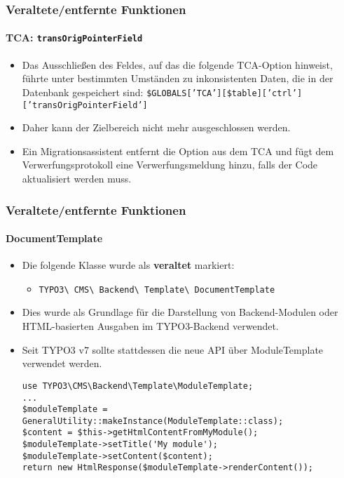 \begin{frame}[fragile]
	\frametitle{Veraltete/entfernte Funktionen}
	\framesubtitle{TCA: \texttt{transOrigPointerField}}

	\begin{itemize}
		\item Das Ausschließen des Feldes, auf das die folgende TCA-Option hinweist, führte unter bestimmten Umständen zu inkonsistenten Daten, die in der Datenbank gespeichert sind:
			\small
				\texttt{\$GLOBALS['TCA'][\$table]['ctrl']['transOrigPointerField']}
			\normalsize

		\item Daher kann der Zielbereich nicht mehr ausgeschlossen werden.
		\item Ein Migrationsassistent entfernt die Option aus dem TCA und fügt dem Verwerfungsprotokoll
			eine Verwerfungsmeldung hinzu, falls der Code aktualisiert werden muss.
	\end{itemize}

\end{frame}


\begin{frame}[fragile]
	\frametitle{Veraltete/entfernte Funktionen}
	\framesubtitle{DocumentTemplate}

	\lstset{basicstyle=\tiny\ttfamily}

	\begin{itemize}
		\item Die folgende Klasse wurde als \textbf{veraltet} markiert:

			\begin{itemize}
				\item \texttt{TYPO3\textbackslash
					CMS\textbackslash
					Backend\textbackslash
					Template\textbackslash
					DocumentTemplate}
			\end{itemize}

		\item Dies wurde als Grundlage für die Darstellung von Backend-Modulen oder HTML-basierten Ausgaben im TYPO3-Backend verwendet.
		\item Seit TYPO3 v7 sollte stattdessen die neue API über ModuleTemplate verwendet werden.

\vspace{-0.4cm}
\begin{lstlisting}
use TYPO3\CMS\Backend\Template\ModuleTemplate;
...
$moduleTemplate = GeneralUtility::makeInstance(ModuleTemplate::class);
$content = $this->getHtmlContentFromMyModule();
$moduleTemplate->setTitle('My module');
$moduleTemplate->setContent($content);
return new HtmlResponse($moduleTemplate->renderContent());
\end{lstlisting}

	\end{itemize}

\end{frame}

